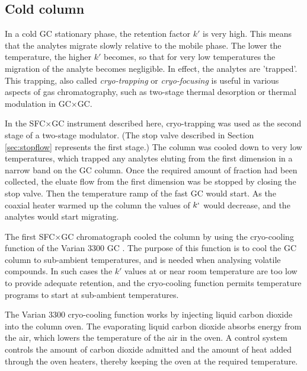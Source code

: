 \subsection{Cold column}
\label{sec:ColdColumn}

In a cold GC stationary phase, the retention factor \(k'\) is very high. This
means that the analytes migrate slowly relative to the mobile phase. The lower
the temperature, the higher \(k'\) becomes, so that for very low temperatures
the migration of the analyte becomes negligible. In effect, the analytes are
'trapped'. This trapping, also called \textit{cryo-trapping} or
\textit{cryo-focusing} is useful in various aspects of gas chromatography, such
as two-stage thermal desorption or thermal modulation in GC×GC. 


In the SFC×GC instrument described here, cryo-trapping was used as the second
stage of a two-stage modulator. (The stop valve described in Section
\ref{sec:stopflow} represents the first stage.) The column was cooled down to
very low temperatures, which trapped any analytes eluting from the first
dimension in a narrow band on the GC column. Once the required amount of
fraction had been collected, the eluate flow from the first dimension was be
stopped by closing the stop valve. Then the temperature ramp of the fast GC
would start. As the coaxial heater warmed up the column the values of \(k`\)
would decrease, and the analytes would start migrating.

The first SFC×GC chromatograph cooled the column by using the cryo-cooling
function of the Varian 3300 GC \autocite{Venter2004, Venter2003}. The purpose of
this function is to cool the GC column to sub-ambient temperatures, and is
needed when analysing volatile compounds. In such cases the \(k'\) values
at or near room temperature are too low to provide adequate retention, and the
cryo-cooling function permits temperature programs to start at sub-ambient
temperatures.

The Varian 3300 cryo-cooling function works by injecting liquid carbon dioxide
into the column oven. The evaporating liquid carbon dioxide absorbs energy from the
air, which lowers the temperature of the air in the oven. A control system
controls the amount of carbon dioxide admitted and the amount of heat added
through the oven heaters, thereby keeping the oven at the required temperature.

